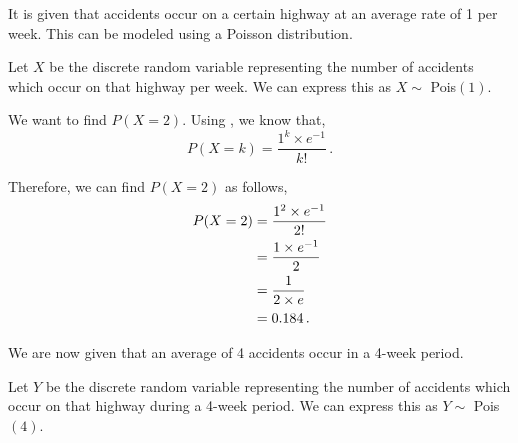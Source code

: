 %
%

\begin{subquestions}
	

\subquestion

It is given that accidents occur on a certain highway at an average rate of 1 per week. This can be modeled using a Poisson distribution.

Let $X$ be the discrete random variable representing the number of accidents which occur on that highway per week. We can express this as $X \sim $ Pois$(1)$.

\begin{subsubquestions}
	
\subsubquestion

We want to find $P(X=2)$. Using , we know that,
\begin{equation}
	P(X=k)= \frac{1^k \times e^{-1}}{k!} \,.
\end{equation}
	
Therefore, we can find $P(X=2)$ as follows,
\begin{align}
	P(X=2) & = \frac{1^2 \times e^{-1}}{2!} \nonumber \\
	       & = \frac{1 \times e^{-1}}{2} \nonumber \\
	       & = \frac{1}{2 \times e} \nonumber \\
	       & = 0.184 \,.
\end{align}
	

\subsubquestion

We are now given that an average of 4 accidents occur in a 4-week period. 

Let $Y$ be the discrete random variable representing the number of accidents which occur on that highway during a 4-week period. We can express this as $Y \sim $ Pois$(4)$.


\end{subsubquestions}
\end{subquestions}
